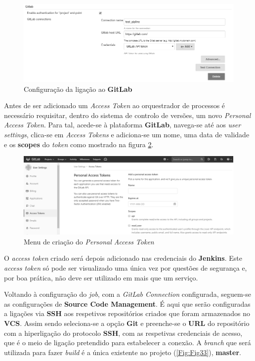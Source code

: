 \begin{figure}[hbt!]
\centering
\includegraphics[width=0.9\linewidth]{Cap5/ConfigureSystem.png}
\caption{Configuração da ligação ao \textbf{GitLab}}
\label{Fig:Fig31}
\end{figure}

\hspace{1cm}Antes de ser adicionado um \textit{Access Token} ao orquestrador de processos é necessário requisitar, dentro do sistema de controlo de versões, um novo \textit{Personal Access Token}. Para tal, acede-se à plataforma \textbf{GitLab}, navega-se até aos \textit{user settings}, clica-se em \textit{Access Tokens} e adiciona-se um nome, uma data de validade e os \textbf{scopes} do \textit{token} como mostrado na figura \ref{Fig:Fig32}.

\begin{figure}[hbt!]
\centering
\includegraphics[width=0.9\linewidth]{Cap5/GitLabAccessToken.png}
\caption{Menu de criação do \textit{Personal Access Token} }
\label{Fig:Fig32}
\end{figure}

O \textit{access token} criado será depois adicionado nas credenciais do \textbf{Jenkins}. Este \textit{access token} só pode ser visualizado uma única vez por questões de segurança e, por boa prática, não deve ser utilizado em mais que um serviço.

\hspace{1cm}Voltando à configuração do \textit{job}, com a \textit{GitLab Connection} configurada, seguem-se as configurações de \textbf{Source Code Management}. É aqui que serão configuradas a ligações via \textbf{SSH} aos respetivos repositórios criados que foram armazenados no \textbf{VCS}. Assim sendo seleciona-se a opção \textbf{Git} e preenche-se o \textbf{URL} do repositório com a hiperligação do protocolo \textbf{SSH}, com as respetivas credenciais de acesso, que é o meio de ligação pretendido para estabelecer a conexão. A \textit{branch} que será utilizada para fazer \textit{build} é a única existente no projeto (\ref{Fig:Fig33}), \textbf{master}.


